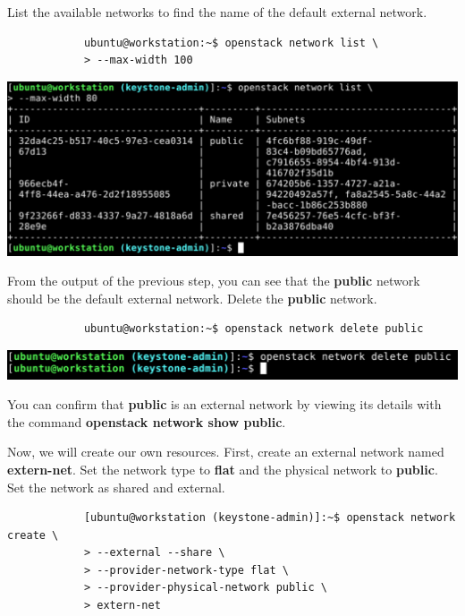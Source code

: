 \documentclass[letterpaper, 12pt]{article}
\begin{document}
\begin{enumerate}
    \begin{labstep}
        List the available networks to find the name of the default external network.
        \begin{lstlisting}
            ubuntu@workstation:~$ openstack network list \
            > --max-width 100
        \end{lstlisting}

        \begin{center}
            \includegraphics[width=\linewidth]{images/part1/step10.png}
        \end{center}
    \end{labstep}

    \begin{labstep}
        From the output of the previous step, you can see that the \textbf{public} network should be the default external network.
        Delete the \textbf{public} network.
        \begin{lstlisting}
            ubuntu@workstation:~$ openstack network delete public
        \end{lstlisting}

        \begin{center}
            \includegraphics[width=\linewidth]{images/part1/step11.png}
        \end{center}
    \end{labstep}

    \begin{tipbox}
        You can confirm that \textbf{public} is an external network by viewing its details with the command \textbf{openstack network show public}.
    \end{tipbox}

    \begin{labstep}
        Now, we will create our own resources.
        First, create an external network named \textbf{extern-net}.
        Set the network type to \textbf{flat} and the physical network to \textbf{public}.
        Set the network as shared and external.
        \begin{lstlisting}
            [ubuntu@workstation (keystone-admin)]:~$ openstack network create \
            > --external --share \
            > --provider-network-type flat \
            > --provider-physical-network public \
            > extern-net
        \end{lstlisting}


\end{labstep}
\end{enumerate}
\end{document}
